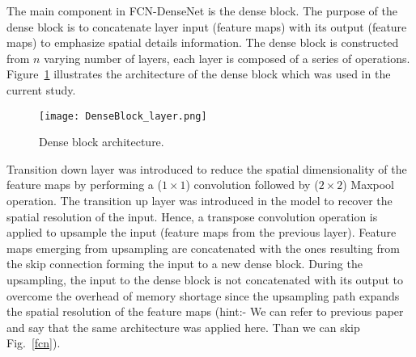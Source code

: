 The main component in FCN-DenseNet is the dense block.
The purpose of the dense block is to concatenate layer input (feature maps) with its output (feature maps) to emphasize spatial details information.
The dense block is constructed from \(n\) varying number of layers, each layer is composed of a series of operations.
Figure~\ref{dense_block} illustrates the architecture of the dense block which was used in the current study.
\begin{figure} [h!]
	\begin{center}
		\texttt{[image: DenseBlock\_layer.png]}
	\end{center}
	\caption{Dense block architecture.} 
	\label{dense_block}
\end{figure}
Transition down layer was introduced to reduce the spatial dimensionality of the feature maps by performing a (\(1\times 1\)) convolution followed by (\(2\times2\)) Maxpool operation. 
The transition up layer was introduced in the model to recover the spatial resolution of the input. 
Hence, a transpose convolution operation is applied to upsample the input (feature maps from the previous layer).
Feature maps emerging from upsampling are concatenated with the ones resulting from the skip connection forming the input to a new dense block.
During the upsampling, the input to the dense block is not concatenated with its output to overcome the overhead of memory shortage since the upsampling path expands the spatial resolution of the feature maps (hint:- We can refer to previous paper and say that the same architecture was applied here. Than we can skip Fig.~\ref{fcn}).
